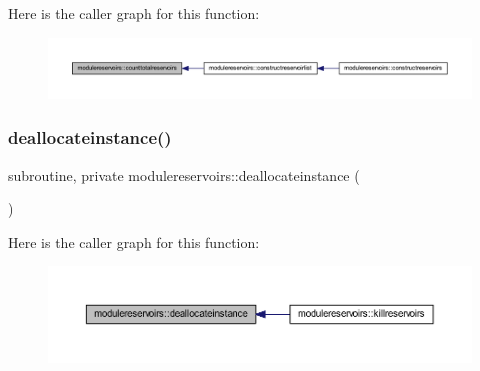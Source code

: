 Here is the caller graph for this function\+:\nopagebreak
\begin{figure}[H]
\begin{center}
\leavevmode
\includegraphics[width=350pt]{namespacemodulereservoirs_ac5bf14d3b0efa223e5c19855bb2380f2_icgraph}
\end{center}
\end{figure}
\mbox{\label{namespacemodulereservoirs_a8f177c238d3cfcadea634aef11e22772}} 
\subsubsection{\texorpdfstring{deallocateinstance()}{deallocateinstance()}}
{\footnotesize\ttfamily subroutine, private modulereservoirs\+::deallocateinstance (\begin{DoxyParamCaption}{ }\end{DoxyParamCaption})\hspace{0.3cm}{\ttfamily [private]}}

Here is the caller graph for this function\+:\nopagebreak
\begin{figure}[H]
\begin{center}
\leavevmode
\includegraphics[width=350pt]{namespacemodulereservoirs_a8f177c238d3cfcadea634aef11e22772_icgraph}
\end{center}
\end{figure}
\mbox{\label{namespacemodulereservoirs_ad77a25bc54ff54f0753ca4576febd9fb}} 
